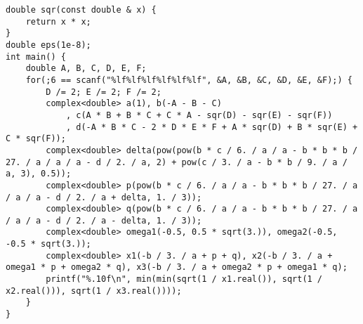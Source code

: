 \begin{lstlisting}
double sqr(const double & x) {
    return x * x;
}
double eps(1e-8);
int main() {
    double A, B, C, D, E, F;
    for(;6 == scanf("%lf%lf%lf%lf%lf%lf", &A, &B, &C, &D, &E, &F);) {
    	D /= 2; E /= 2; F /= 2;
        complex<double> a(1), b(-A - B - C)
        	, c(A * B + B * C + C * A - sqr(D) - sqr(E) - sqr(F))
        	, d(-A * B * C - 2 * D * E * F + A * sqr(D) + B * sqr(E) + C * sqr(F));
        complex<double> delta(pow(pow(b * c / 6. / a / a - b * b * b / 27. / a / a / a - d / 2. / a, 2) + pow(c / 3. / a - b * b / 9. / a / a, 3), 0.5));
        complex<double> p(pow(b * c / 6. / a / a - b * b * b / 27. / a / a / a - d / 2. / a + delta, 1. / 3));
        complex<double> q(pow(b * c / 6. / a / a - b * b * b / 27. / a / a / a - d / 2. / a - delta, 1. / 3));
        complex<double> omega1(-0.5, 0.5 * sqrt(3.)), omega2(-0.5, -0.5 * sqrt(3.));
        complex<double> x1(-b / 3. / a + p + q), x2(-b / 3. / a + omega1 * p + omega2 * q), x3(-b / 3. / a + omega2 * p + omega1 * q);
        printf("%.10f\n", min(min(sqrt(1 / x1.real()), sqrt(1 / x2.real())), sqrt(1 / x3.real())));
    }
}
\end{lstlisting}

